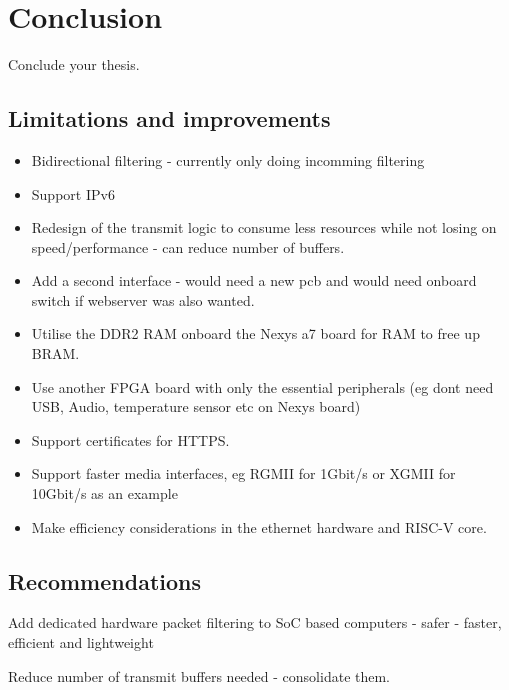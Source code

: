 \chapter[Conclusion]{Conclusion}
\label{Chap:Conclusion}

Conclude your thesis.


\section{Limitations and improvements}

\begin{itemize}
    \item Bidirectional filtering - currently only doing incomming filtering
    \item Support IPv6
    \item Redesign of the transmit logic to consume less resources while not losing on speed/performance - can reduce number of buffers. 
    \item Add a second interface - would need a new pcb and would need onboard switch if webserver was also wanted.
    \item Utilise the DDR2 RAM onboard the Nexys a7 board for RAM to free up BRAM. 
    \item Use another FPGA board with only the essential peripherals (eg dont need USB, Audio, temperature sensor etc on Nexys board)
    \item Support certificates for HTTPS. 
    \item Support faster media interfaces, eg RGMII for 1Gbit/s or XGMII for 10Gbit/s as an example
    \item Make efficiency considerations in the ethernet hardware and RISC-V core. 
\end{itemize}


\section{Recommendations}

Add dedicated hardware packet filtering to SoC based computers - safer - faster, efficient and lightweight

Reduce number of transmit buffers needed - consolidate them.

